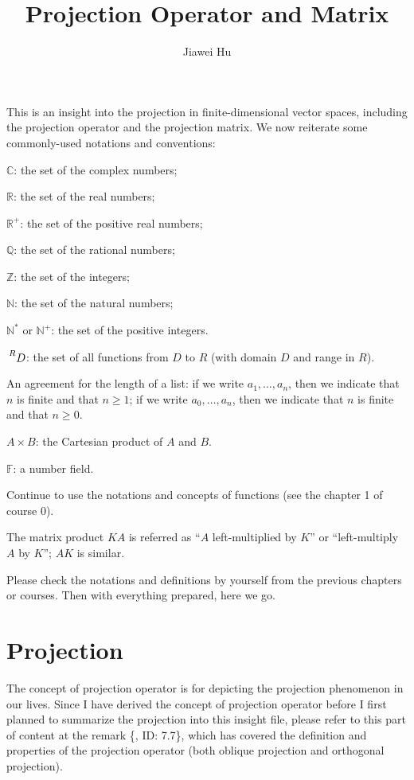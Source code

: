 \documentclass{article}
\title{\LARGE \textbf{Projection Operator and Matrix}}
\author{\large Jiawei Hu}
\begin{document}
\maketitle
\tableofcontents
\newpage

This is an insight into the projection in finite-dimensional vector spaces, including the projection operator and the projection matrix. We now reiterate some commonly-used notations and conventions:
\begin{compactenum}
    \item $\mathbb{C}$: the set of the complex numbers;
    \item $\mathbb{R}$: the set of the real numbers;
    \item $\mathbb{R}^+$: the set of the positive real numbers;
    \item $\mathbb{Q}$: the set of the rational numbers;
    \item $\mathbb{Z}$: the set of the integers;
    \item $\mathbb{N}$: the set of the natural numbers;
    \item $\mathbb{N^\ast}$ or $\mathbb{N}^+$: the set of the positive integers.
    \item $\sideset{^R}{}{\mathop{D}}$: the set of all functions from $D$ to $R$ (with domain $D$ and range in $R$).
    \item An agreement for the length of a list: if we write $a_1, \dots, a_n$, then we indicate that $n$ is finite and that $n\geq 1$; if we write $a_0, \dots, a_n$, then we indicate that $n$ is finite and that $n\geq 0$.
    \item $A\times B$: the Cartesian product of $A$ and $B$.
    \item $\mathbb{F}$: a number field.
    \item Continue to use the notations and concepts of functions (see the chapter 1 of course 0).
    \item The matrix product $KA$ is referred as ``$A$ left-multiplied by $K$'' or ``left-multiply $A$ by $K$''; $AK$ is similar.
\end{compactenum} 
Please check the notations and definitions by yourself from the previous chapters or courses. Then with everything prepared, here we go.

\section{Projection}

The concept of projection operator is for depicting the projection phenomenon in our lives. Since I have derived the concept of projection operator before I first planned to summarize the projection into this insight file, please refer to this part of content at the remark \{, ID: 7.7\}, which has covered the definition and properties of the projection operator (both oblique projection and orthogonal projection).
\end{document}
